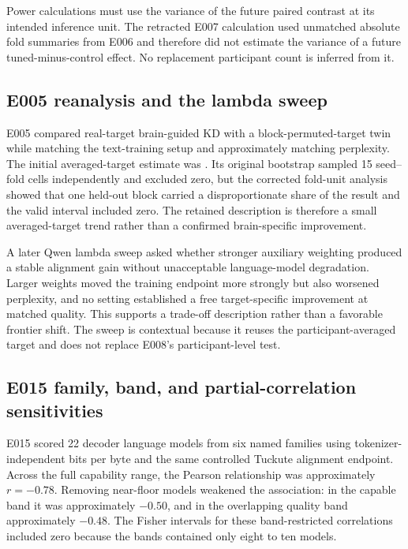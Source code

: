 Power calculations must use the variance of the future paired contrast at its intended inference unit.
The retracted E007 calculation used unmatched absolute fold summaries from E006 and therefore did not estimate the variance of a future tuned-minus-control effect.
No replacement participant count is inferred from it.

\subsection{E005 reanalysis and the lambda sweep}
\label{sec:e005-detail}

E005 compared real-target brain-guided KD with a block-permuted-target twin while matching the text-training setup and approximately matching perplexity.
The initial averaged-target estimate was . 
Its original bootstrap sampled 15 seed--fold cells independently and excluded zero, but the corrected fold-unit analysis showed that one held-out block carried a disproportionate share of the result and the valid interval included zero.
The retained description is therefore a small averaged-target trend rather than a confirmed brain-specific improvement.

A later Qwen lambda sweep asked whether stronger auxiliary weighting produced a stable alignment gain without unacceptable language-model degradation.
Larger weights moved the training endpoint more strongly but also worsened perplexity, and no setting established a free target-specific improvement at matched quality. 
This supports a trade-off description rather than a favorable frontier shift.
The sweep is contextual because it reuses the participant-averaged target and does not replace E008's participant-level test.

\subsection{E015 family, band, and partial-correlation sensitivities}
\label{sec:e015-detail}

E015 scored 22 decoder language models from six named families using tokenizer-independent bits per byte and the same controlled Tuckute alignment endpoint.
Across the full capability range, the Pearson relationship was approximately $r=-0.78$. 
Removing near-floor models weakened the association: in the capable band it was approximately $-0.50$, and in the overlapping quality band approximately $-0.48$. 
The Fisher intervals for these band-restricted correlations included zero because the bands contained only eight to ten models.

